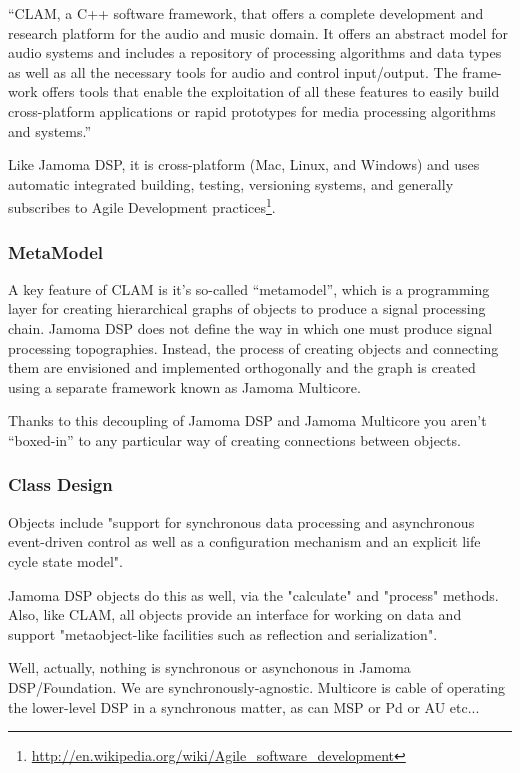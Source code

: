 \documentclass[twoside,10pt]{article}
\begin{document}
``CLAM, a C++ software framework, that offers a complete development and research platform for the audio and music domain. It offers an abstract model for audio systems and includes a repository of processing algorithms and data types as well as all the necessary tools for audio and control input/output. The frame- work offers tools that enable the exploitation of all these features to easily build cross-platform applications or rapid prototypes for media processing algorithms and systems.'' \cite{Amatraian:2008}

Like Jamoma DSP, it is cross-platform (Mac, Linux, and Windows) and uses automatic integrated building, testing, versioning systems, and generally subscribes to Agile Development practices\footnote{\url{http://en.wikipedia.org/wiki/Agile_software_development}}.  
                                      
\subsubsection{MetaModel}

A key feature of CLAM is it's so-called ``metamodel'', which is a programming layer for creating hierarchical graphs of objects to produce a signal processing chain.  Jamoma DSP does not define the way in which one must produce signal processing topographies.  Instead, the process of creating objects and connecting them are envisioned and implemented orthogonally and the graph is created using a separate framework known as Jamoma Multicore.

Thanks to this decoupling of Jamoma DSP and Jamoma Multicore you aren't ``boxed-in'' to any particular way of creating connections between objects.

\subsubsection{Class Design}

Objects include "support for synchronous data processing and asynchronous event-driven control as well as a configuration mechanism and an explicit life cycle state model". 

Jamoma DSP objects do this as well, via the "calculate" and "process" methods.  Also, like CLAM, all objects provide an interface for working on data and support "metaobject-like facilities such as reflection and serialization".

Well, actually, nothing is synchronous or asynchonous in Jamoma DSP/Foundation.  We are synchronously-agnostic.  Multicore is cable of operating the lower-level DSP in a synchronous matter, as can MSP or Pd or AU etc...
\end{document}
